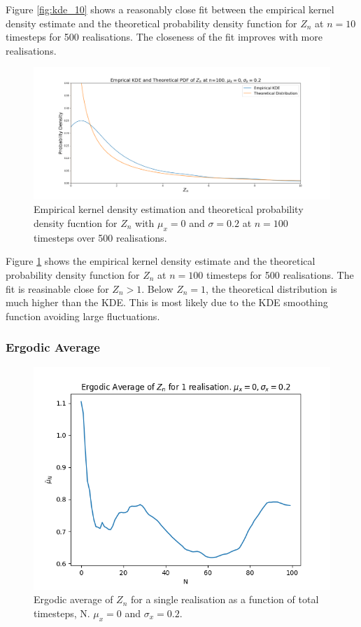 \documentclass{article}
\begin{document}
Figure \ref{fig:kde_10} shows a reasonably close fit between the empirical kernel density estimate and the theoretical probability density function for $Z_n$ at $n=10$ timesteps for 500 realisations. The closeness of the fit improves with more realisations.


\begin{figure}[H]
\includegraphics[scale=0.3]{empirical_pdf_kde_100_a.png} 
\caption{Empirical kernel density estimation and theoretical probability density fucntion for $Z_n$ with $\mu_x=0$ and $\sigma=0.2$ at $n=100$ timesteps over 500 realisations.}
\label{fig:kde_100}
\end{figure}

Figure \ref{fig:kde_100} shows the empirical kernel density estimate and the theoretical probability density function for $Z_n$ at $n=100$ timesteps for 500 realisations. The fit is reasinable close for $Z_n > 1$. Below $Z_n=1$, the theoretical distribution is much higher than the KDE. This is most likely due to the KDE smoothing function avoiding large fluctuations. 


\subsubsection{Ergodic Average}

\begin{figure}[H]
\includegraphics[scale=0.8]{ergodic_average_a.png} 
\caption{Ergodic average of $Z_n$ for a single realisation as a function of total timesteps, N. $\mu_x=0$ and $\sigma_x=0.2$.}
\label{fig:ergodic}
\end{figure}
\end{document}
